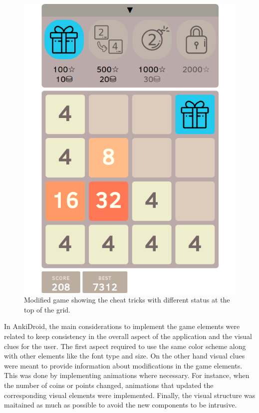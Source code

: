\begin{figure}[htb]
    \vskip 5mm
        \begin{center}
            \includegraphics[scale=0.4]{./Figures/modified_game.png}
            \caption{Modified game showing the cheat tricks with different status at the top of the grid.}
            \label{fig:modified-game}
        \end{center}
    \vskip -5mm
\end{figure}

In AnkiDroid, the main considerations to implement the game elements were related to keep consistency in the overall aspect of the application and the visual clues for the user. The first aspect required to use the same color scheme along with other elements like the font type and size. On the other hand visual clues were meant to provide information about modifications in the game elements. This was done by implementing animations where necessary. For instance, when the number of coins or points changed, animations that updated the corresponding visual elements were implemented. Finally, the visual structure was maitained as much as possible to avoid the new components to be intrusive.







